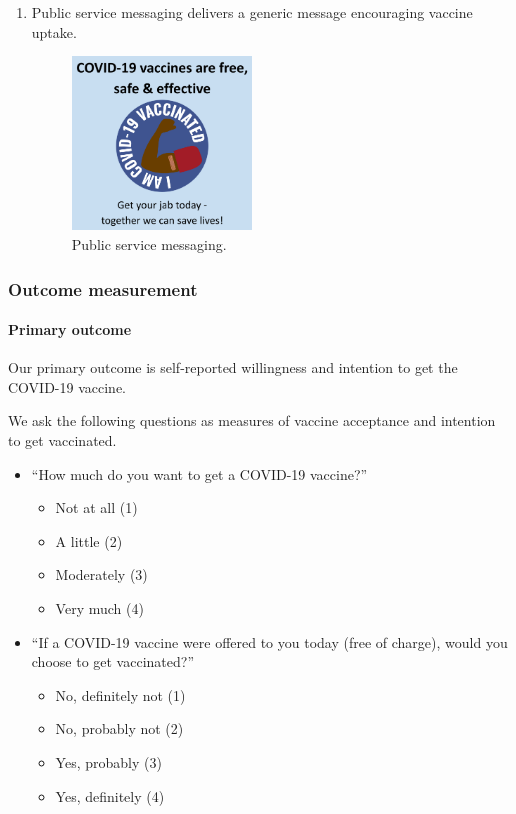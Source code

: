 \documentclass[letterpaper, 12pt, parskip=full,DIV=10]{scrartcl}
\begin{document}
\begin{enumerate}
\begin{enumerate}[noitemsep, topsep=0pt]
  \end{enumerate}
  \item {Public service messaging} delivers a generic message encouraging vaccine uptake. 
  \begin{figure}[h!]
   \centering
   \includegraphics[width = 0.45\textwidth]{../../tables-figures/psa.png} 
   \caption{Public service messaging.}
   \label{fig:psa}
\end{figure}
\end{enumerate}


\subsubsection{Outcome measurement}

\paragraph{Primary outcome}
Our primary outcome is self-reported willingness and intention to get the COVID-19 vaccine.

We ask the following questions as measures of vaccine acceptance and intention to get vaccinated. 

\begin{itemize}
\item ``How much do you want to get a COVID-19 vaccine?''
\begin{itemize}[noitemsep, topsep=0pt]
\item Not at all (1)
\item A little (2)
\item Moderately (3)
 \item Very much (4)
\end{itemize}
\item ``If a COVID-19 vaccine were offered to you today (free of charge), would you choose to get vaccinated?''
\begin{itemize}[noitemsep, topsep=0pt]
\item No, definitely not (1) 
\item No, probably not (2)
\item Yes, probably (3)
\item Yes, definitely (4)
\end{itemize}
\end{itemize}
\end{document}
